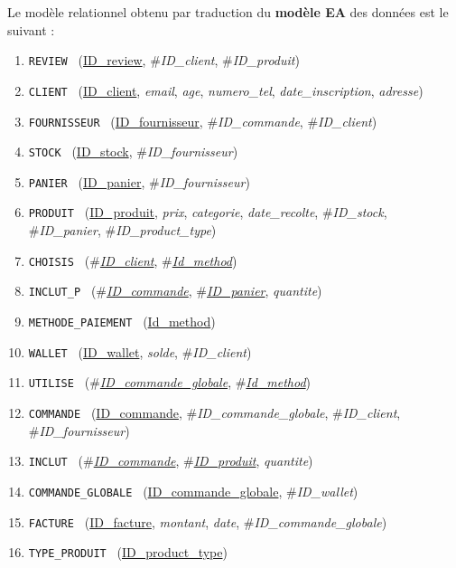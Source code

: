 \documentclass[a4paper,12pt]{report}
\newcommand{\attr}[1]{\emph{#1}}
\newcommand{\texit}[1]{\#\textsl{#1}}
\theoremstyle{break}
\theoremstyle{break}
\theoremstyle{break}
\theoremstyle{break}
\theoremstyle{definition}
\theoremstyle{remark}
\begin{document}
\newpage
Le modèle relationnel obtenu par traduction du \textbf{modèle EA} des données est le suivant :
\begin{enumerate}
  \item { \texttt{REVIEW } (\underline{ID\_review}, \texit{ID\_client}, \texit{ID\_produit}) }
  \item { \texttt{CLIENT } (\underline{ID\_client}, \attr{email}, \attr{age}, \attr{numero\_tel}, \attr{date\_inscription}, \attr{adresse}) }
  \item { \texttt{FOURNISSEUR } (\underline{ID\_fournisseur}, \texit{ID\_commande}, \texit{ID\_client}) }
  \item { \texttt{STOCK } (\underline{ID\_stock}, \texit{ID\_fournisseur}) }
  \item { \texttt{PANIER } (\underline{ID\_panier}, \texit{ID\_fournisseur}) }
  \item { \texttt{PRODUIT } (\underline{ID\_produit}, \attr{prix}, \attr{categorie}, \attr{date\_recolte}, \texit{ID\_stock}, \texit{ID\_panier}, \texit{ID\_product\_type}) }
  \item { \texttt{CHOISIS } (\texit{\underline{ID\_client}}, \texit{\underline{Id\_method}}) }
  \item { \texttt{INCLUT\_P } (\texit{\underline{ID\_commande}}, \texit{\underline{ID\_panier}}, \attr{quantite}) }
  \item { \texttt{METHODE\_PAIEMENT } (\underline{Id\_method}) }
  \item { \texttt{WALLET } (\underline{ID\_wallet}, \attr{solde}, \texit{ID\_client}) }
  \item { \texttt{UTILISE } (\texit{\underline{ID\_commande\_globale}}, \texit{\underline{Id\_method}}) }
  \item { \texttt{COMMANDE } (\underline{ID\_commande}, \texit{ID\_commande\_globale}, \texit{ID\_client}, \texit{ID\_fournisseur}) }
  \item { \texttt{INCLUT } (\texit{\underline{ID\_commande}}, \texit{\underline{ID\_produit}}, \attr{quantite}) }
  \item { \texttt{COMMANDE\_GLOBALE } (\underline{ID\_commande\_globale}, \texit{ID\_wallet}) }
  \item { \texttt{FACTURE } (\underline{ID\_facture}, \attr{montant}, \attr{date}, \texit{ID\_commande\_globale}) }
  \item { \texttt{TYPE\_PRODUIT } (\underline{ID\_product\_type})}
\end{enumerate}
\end{document}

